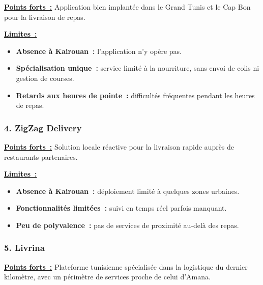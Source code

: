 \documentclass[12pt,fleqn,a4paper]{report}
\begin{document}
\begin{justify}
\noindent \textbf{\underline{Points forts~:}}
Application bien implantée dans le Grand Tunis et le Cap Bon pour la livraison de repas.

\vspace{0.2cm}
\noindent \textbf{\underline{Limites~:}}
\begin{itemize}
    \item \textbf{Absence à Kairouan~:} l'application n'y opère pas.
    \item \textbf{Spécialisation unique~:} service limité à la nourriture, sans envoi de colis ni gestion de courses.
    \item \textbf{Retards aux heures de pointe~:} difficultés fréquentes pendant les heures de repas.
\end{itemize}

\vspace{0.4cm}

\subsubsection*{\Large \textbf{4. ZigZag Delivery}}
\vspace{0.2cm}

\noindent \textbf{\underline{Points forts~:}}
Solution locale réactive pour la livraison rapide auprès de restaurants partenaires.

\vspace{0.2cm}
\noindent \textbf{\underline{Limites~:}}
\begin{itemize}
    \item \textbf{Absence à Kairouan~:} déploiement limité à quelques zones urbaines.
    \item \textbf{Fonctionnalités limitées~:} suivi en temps réel parfois manquant.
    \item \textbf{Peu de polyvalence~:} pas de services de proximité au-delà des repas.
\end{itemize}

\vspace{0.4cm}

\subsubsection*{\Large \textbf{5. Livrina}}
\vspace{0.2cm}

\noindent \textbf{\underline{Points forts~:}}
Plateforme tunisienne spécialisée dans la logistique du dernier kilomètre, avec un périmètre de services proche de celui d'Amana.


\end{justify}
\end{document}
